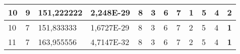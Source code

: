 \documentclass[conference]{IEEEtran}
\begin{document}
\begin{table*}[]
\begin{tabular}{|llll|llllllll|}
\multicolumn{1}{|l|}{10}                                                    & \multicolumn{1}{l|}{9}                                                        & \multicolumn{1}{l|}{151,222222}                                                   & 2,248E-29                      & \multicolumn{1}{l|}{8}                                                  & \multicolumn{1}{l|}{3}                                                  & \multicolumn{1}{l|}{6}                                                  & \multicolumn{1}{l|}{7}                                                  & \multicolumn{1}{l|}{\textbf{1}}                                         & \multicolumn{1}{l|}{5}                                                  & \multicolumn{1}{l|}{4}                                                  & 2                          \\ \hline
\multicolumn{1}{|l|}{10}                                                    & \multicolumn{1}{l|}{7}                                                        & \multicolumn{1}{l|}{151,833333}                                                   & 1,6727E-29                     & \multicolumn{1}{l|}{8}                                                  & \multicolumn{1}{l|}{3}                                                  & \multicolumn{1}{l|}{6}                                                  & \multicolumn{1}{l|}{7}                                                  & \multicolumn{1}{l|}{2}                                                  & \multicolumn{1}{l|}{5}                                                  & \multicolumn{1}{l|}{4}                                                  & \textbf{1}                 \\ \hline
\multicolumn{1}{|l|}{11}                                                    & \multicolumn{1}{l|}{7}                                                        & \multicolumn{1}{l|}{163,955556}                                                   & 4,7147E-32                     & \multicolumn{1}{l|}{8}                                                  & \multicolumn{1}{l|}{3}                                                  & \multicolumn{1}{l|}{6}                                                  & \multicolumn{1}{l|}{7}                                                  & \multicolumn{1}{l|}{2}                                                  & \multicolumn{1}{l|}{5}                                                  & \multicolumn{1}{l|}{4}                                                  & \textbf{1}                 \\ \hline

\end{tabular}
\end{table*}
\end{document}

